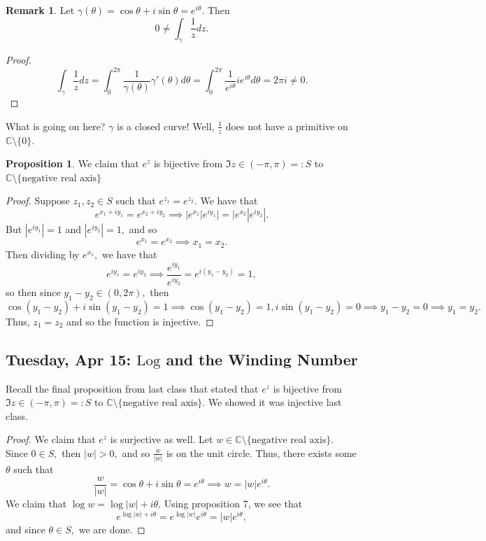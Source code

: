 \documentclass[10pt, oneside]{article}
\newcommand{\bbC}{\mathbb{C}}
\newcommand{\Log}{\text{Log}}
\newcommand{\sm}{\setminus}
\theoremstyle{definition}
\newtheorem{prop}{Proposition}
\newtheorem{rem}{Remark}
\newcommand{\bbC}{\mathbb{C}}
\newcommand{\sm}{\setminus}
\begin{document}
\begin{rem}
    Let $\gamma(\theta) = \cos \theta + i\sin \theta = e^{i\theta}.$ Then 
    \[0 \neq \int_\gamma \frac{1}{z}dz.\]
\begin{proof}
    \[\int_\gamma \frac{1}{z}dz = \int_0^{2\pi}\frac{1}{\gamma(\theta)}\gamma'(\theta)d\theta = \int_0^{2\pi}\frac{1}{e^{i\theta}}ie^{i\theta}d\theta = 2\pi i \neq 0.\]
\end{proof}
What is going on here? $\gamma$ is a closed curve! Well, $\frac{1}{z}$ does not have a primitive on $\bbC \sm \{0\}.$
\end{rem}
\begin{prop}
    We claim that $e^z$ is bijective from $\Im{z} \in (-\pi, \pi) =: S$ to $\bbC\sm\{\text{negative real axis}\}$
\end{prop}
\begin{proof}
    Suppose $z_1, z_2 \in S$ such that $e^{z_1} = e^{z_2}.$ We have that 
    \[e^{x_1 + iy_1} = e^{x_2 + iy_2} \implies |e^{x_1}|e^{iy_1}| = |e^{x_2}|e^{iy_2}|.\] But $|e^{iy_1}| = 1$ and $|e^{iy_2}| = 1,$ and so 
    \[e^{x_1} = e^{x_2} \implies x_1 = x_2.\] Then dividing by $e^{x_1},$ we have that 
    \[e^{iy_1} = e^{i y_2} \implies \frac{e^{i y_1}}{e^{i y_2}} =e^{i(y_1 - y_2)} = 1,\] so then since $y_1 - y_2 \in (0, 2\pi),$ then
    \[\cos(y_1 - y_2) + i \sin (y_1 - y_2) = 1 \implies \cos(y_1 - y_2) = 1, i\sin(y_1 - y_2) = 0 \implies y_1 - y_2 = 0 \implies y_1 = y_2.\] Thus, $z_1 = z_2$ and so the function is injective.  
\end{proof}


\newpage
\subsection{Tuesday, Apr 15: $\Log$ and the Winding Number}
Recall the final proposition from last class that stated that $e^z$ is bijective from $\Im{z} \in (-\pi, \pi) =: S$ to $\bbC\sm\{\text{negative real axis}\}.$ We showed it was injective last class. 
\begin{proof}
    We claim that $e^z$ is surjective as well. Let $w \in \bbC\sm\{\text{negative real axis}\}.$ Since $0 \in S,$ then $|w| >0,$ and so $\frac{w}{|w|}$ is on the unit circle. Thus, there exists some $\theta$ such that 
    \[\frac{w}{|w|} = \cos \theta + i \sin \theta = e^{i\theta} \implies w = |w|e^{i\theta}.\] We claim that $\log w = \log |w| + i\theta.$ Using proposition 7, we see that 
    \[e^{\log |w| + i\theta} = e^{\log |w|}e^{i\theta} = |w|e^{i\theta},\] and since $\theta \in S,$ we are done.
\end{proof}
\end{document}
